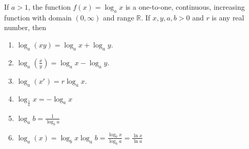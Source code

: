 \begin{frame}
\begin{theorem}
If $a > 1$, the function $f(x) = \log_a x$ is a one-to-one, continuous, increasing function with domain $(0, \infty )$ and range $\mathbb{R}$.  If $x, y, a, b > 0$ and $r$ is any real number, then
\begin{enumerate}
\item  $\log_a (xy) = \log_a x + \log_a y$.
\item  $\log_a \left( \frac{x}{y}\right) = \log_a x - \log_a y$.
\item  $\log_a (x^r) = r\log_a x$.
\item  $\log_{\frac{1}{a}}x=-\log_a x$
\item  $\log_{a}b=\frac{1}{\log_b a}$
\item  $\log_{a}(x)=\log_b x \log_{a} b=\frac{\log_b x}{\log_{b} a}=  \frac{\ln x}{\ln a}$
\end{enumerate}
\end{theorem}
\end{frame}
